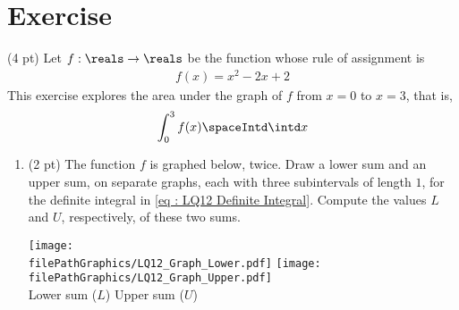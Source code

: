 %
%
%
%

\section{Exercise}


(4 pt) Let $f : \reals \rightarrow \reals$ be the function whose rule of assignment is
\begin{align*}
f(x)
=
x^{2} - 2 x + 2
\end{align*}
This exercise explores the area under the graph of $f$ from $x = 0$ to $x = 3$, that is,
\begin{align}
\int_{0}^{3} f(x) \spaceIntd \intd x%
\label{eq : LQ12 Definite Integral}
\end{align}



\begin{enumerate}[label=(\alph*)]
\item\label{itm : LQ12a} (2 pt) The function $f$ is graphed below, twice. Draw a lower sum and an upper sum, on separate graphs, each with three subintervals of length $1$, for the definite integral in \eqref{eq : LQ12 Definite Integral}. Compute the values $L$ and $U$, respectively, of these two sums.
\begin{center}
\texttt{[image: \\filePathGraphics/LQ12\_Graph\_Lower.pdf]}%
\hspace{1in}
\texttt{[image: \\filePathGraphics/LQ12\_Graph\_Upper.pdf]}%
\\
Lower sum ($L$)
\hspace{1.5in}
Upper sum ($U$)
\end{center}
\end{enumerate}




